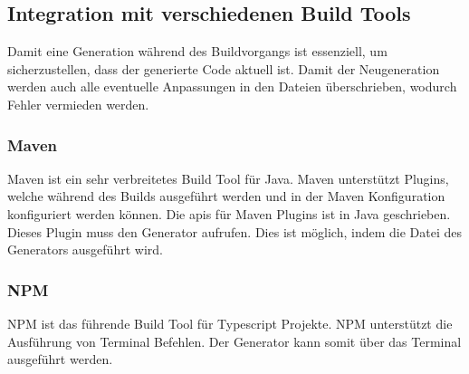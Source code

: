 \documentclass[./einleitung.tex]{subfiles}
\begin{document}
\subsection{Integration mit verschiedenen Build Tools}
Damit eine Generation während des Buildvorgangs ist essenziell, um sicherzustellen, dass der generierte Code aktuell ist.
Damit der Neugeneration werden auch alle eventuelle Anpassungen in den Dateien überschrieben, wodurch Fehler vermieden werden.

\subsubsection{Maven}
Maven ist ein sehr verbreitetes Build Tool für Java.
Maven unterstützt Plugins, welche während des Builds ausgeführt werden und in der Maven Konfiguration konfiguriert werden können.
Die \acrlong{api}s für Maven Plugins ist in Java geschrieben.
Dieses Plugin muss den Generator aufrufen.
Dies ist möglich, indem die Datei des Generators ausgeführt wird.

\subsubsection{NPM}
NPM ist das führende Build Tool für Typescript Projekte.
NPM unterstützt die Ausführung von Terminal Befehlen.
Der Generator kann somit über das Terminal ausgeführt werden.

\end{document}
